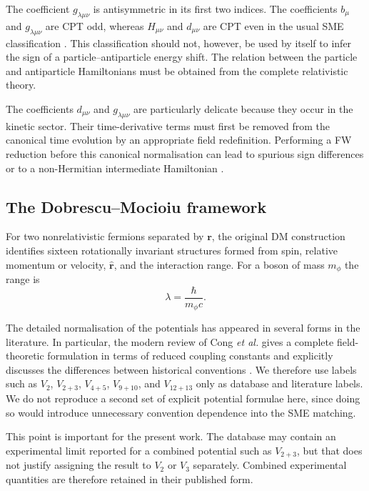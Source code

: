 \documentclass[aps,prd,reprint,superscriptaddress,nofootinbib]{revtex4-2}
\begin{document}
	The coefficient $g_{\lambda\mu\nu}$ is antisymmetric in its first two
indices. The coefficients $b_\mu$ and $g_{\lambda\mu\nu}$ are CPT odd,
whereas $H_{\mu\nu}$ and $d_{\mu\nu}$ are CPT even in the usual SME
classification
	\cite{ColladayKostelecky1997,ColladayKostelecky1998,
		KosteleckyRussell2026}. This classification should not, however, be
	used by itself to infer the sign of a particle--antiparticle energy
	shift. The relation between the particle and antiparticle Hamiltonians
	must be obtained from the complete relativistic theory.
	
	The coefficients $d_{\mu\nu}$ and $g_{\lambda\mu\nu}$ are particularly
delicate because they occur in the kinetic sector. Their time-derivative terms must first be removed from the canonical
time evolution by an appropriate field redefinition. Performing a FW reduction before this canonical
	normalisation can lead to spurious sign differences or to a
	non-Hermitian intermediate Hamiltonian \cite{KosteleckyLane1999}.
	
	\subsection{The Dobrescu--Mocioiu framework}
	
	For two nonrelativistic fermions separated by $\mathbf r$, the original
	DM construction identifies sixteen rotationally invariant structures
	formed from spin, relative momentum or velocity, $\hat{\mathbf r}$,
	and the interaction range. For a boson of mass $m_\phi$ the range is
	\begin{equation}
		\lambda=\frac{\hbar}{m_\phi c}.
		\label{eq:lambda}
	\end{equation}
	
	The detailed normalisation of the potentials has appeared in several
	forms in the literature. In particular, the modern review of
	Cong \textit{et al.} gives a complete field-theoretic formulation in
	terms of reduced coupling constants and explicitly discusses the
	differences between historical conventions
	\cite{Cong2025}. We therefore use labels such as $V_2$, $V_{2+3}$,
	$V_{4+5}$, $V_{9+10}$, and $V_{12+13}$ only as database and literature
	labels. We do not reproduce a second set of explicit potential
	formulae here, since doing so would introduce unnecessary convention
	dependence into the SME matching.
	
	This point is important for the present work. The database may contain
	an experimental limit reported for a combined potential such as
	$V_{2+3}$, but that does not justify assigning the result to $V_2$ or
	$V_3$ separately. Combined experimental quantities are therefore
	retained in their published form.
	
\end{document}
